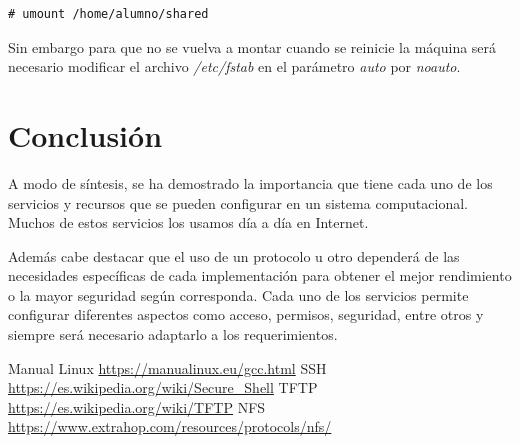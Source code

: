 \documentclass[12pt]{article}
\begin{document}
\begin{lstlisting}[frame=single]
# umount /home/alumno/shared
\end{lstlisting}

 Sin embargo para que no se vuelva a montar cuando se reinicie la máquina será necesario modificar el archivo \emph{/etc/fstab} en el parámetro \emph{auto} por \emph{noauto}.
\newpage
\section{Conclusión}

A modo de síntesis, se ha demostrado la importancia que tiene cada uno de los servicios y recursos que se pueden configurar en un sistema computacional. Muchos de estos servicios los usamos día a día en Internet.

Además cabe destacar que el uso de un protocolo u otro dependerá de las necesidades específicas de cada implementación para obtener el mejor rendimiento o la mayor seguridad según corresponda.  Cada uno de los servicios permite configurar diferentes aspectos como acceso, permisos, seguridad, entre otros y siempre será necesario adaptarlo a los requerimientos.   

\newpage
\begin{thebibliography}{99}
 Manual Linux \url{https://manualinux.eu/gcc.html}
 SSH \url{https://es.wikipedia.org/wiki/Secure_Shell}
 TFTP \url{https://es.wikipedia.org/wiki/TFTP}
 NFS \url{https://www.extrahop.com/resources/protocols/nfs/}
\end{thebibliography}
\end{document}
